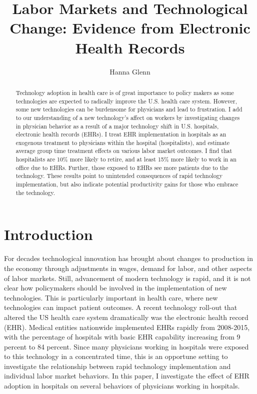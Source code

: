\documentclass[12pt]{article}
\title{Labor Markets and Technological Change: Evidence from Electronic Health Records}
\author{Hanna Glenn}
\begin{document}
\maketitle

\begin{abstract}
    Technology adoption in health care is of great importance to policy makers as some technologies are expected to radically improve the U.S. health care system. However, some new technologies can be burdensome for physicians and lead to frustration. I add to our understanding of a new technology's affect on workers by investigating changes in physician behavior as a result of a major technology shift in U.S. hospitals, electronic health records (EHRs). I treat EHR implementation in hospitals as an exogenous treatment to physicians within the hospital (hospitalists), and estimate average group time treatment effects on various labor market outcomes. I find that hospitalists are 10\% more likely to retire, and at least 15\% more likely to work in an office due to EHRs. Further, those exposed to EHRs see more patients due to the technology. These results point to unintended consequences of rapid technology implementation, but also indicate potential productivity gains for those who embrace the technology.
\end{abstract}

\vspace{1.5cm}

\section{Introduction}
For decades technological innovation has brought about changes to production in the economy through adjustments in wages, demand for labor, and other aspects of labor markets. Still, advancement of modern technology is rapid, and it is not clear how policymakers should be involved in the implementation of new technologies. This is particularly important in health care, where new technologies can impact patient outcomes. A recent technology roll-out that altered the US health care system dramatically was the electronic health record (EHR). Medical entities nationwide implemented EHRs rapidly from 2008-2015, with the percentage of hospitals with basic EHR capability increasing from 9 percent to 84 percent. Since many physicians working in hospitals were exposed to this technology in a concentrated time, this is an opportune setting to investigate the relationship between rapid technology implementation and individual labor market behaviors. In this paper, I investigate the effect of EHR adoption in hospitals on several behaviors of physicians working in hospitals. 
\end{document}
